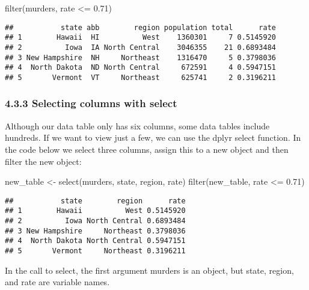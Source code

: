 \documentclass[
]{article}
\newenvironment{Shaded}{\begin{snugshade}}{\end{snugshade}}
\newcommand{\FloatTok}[1]{\textcolor[rgb]{0.00,0.00,0.81}{#1}}
\newcommand{\FunctionTok}[1]{\textcolor[rgb]{0.00,0.00,0.00}{#1}}
\newcommand{\NormalTok}[1]{#1}
\newcommand{\OtherTok}[1]{\textcolor[rgb]{0.56,0.35,0.01}{#1}}
\newcommand{\SpecialCharTok}[1]{\textcolor[rgb]{0.00,0.00,0.00}{#1}}
\begin{document}
\begin{Shaded}
\begin{Highlighting}[]
\FunctionTok{filter}\NormalTok{(murders, rate }\SpecialCharTok{\textless{}=} \FloatTok{0.71}\NormalTok{)}
\end{Highlighting}
\end{Shaded}

\begin{verbatim}
##           state abb        region population total      rate
## 1        Hawaii  HI          West    1360301     7 0.5145920
## 2          Iowa  IA North Central    3046355    21 0.6893484
## 3 New Hampshire  NH     Northeast    1316470     5 0.3798036
## 4  North Dakota  ND North Central     672591     4 0.5947151
## 5       Vermont  VT     Northeast     625741     2 0.3196211
\end{verbatim}

\hypertarget{selecting-columns-with-select}{%
\subsubsection{4.3.3 Selecting columns with
select}\label{selecting-columns-with-select}}

Although our data table only has six columns, some data tables include
hundreds. If we want to view just a few, we can use the dplyr select
function. In the code below we select three columns, assign this to a
new object and then filter the new object:

\begin{Shaded}
\begin{Highlighting}[]
\NormalTok{new\_table }\OtherTok{\textless{}{-}} \FunctionTok{select}\NormalTok{(murders, state, region, rate)}
\FunctionTok{filter}\NormalTok{(new\_table, rate }\SpecialCharTok{\textless{}=} \FloatTok{0.71}\NormalTok{)}
\end{Highlighting}
\end{Shaded}

\begin{verbatim}
##           state        region      rate
## 1        Hawaii          West 0.5145920
## 2          Iowa North Central 0.6893484
## 3 New Hampshire     Northeast 0.3798036
## 4  North Dakota North Central 0.5947151
## 5       Vermont     Northeast 0.3196211
\end{verbatim}

In the call to select, the first argument murders is an object, but
state, region, and rate are variable names.
\end{document}
